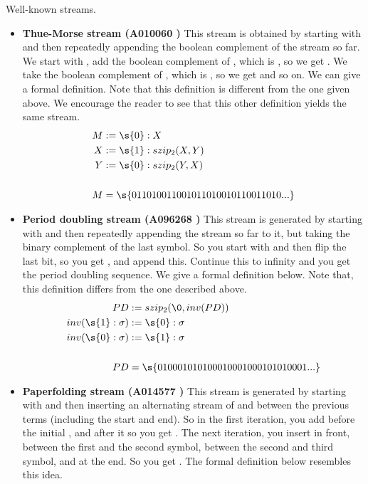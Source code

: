 \begin{example}{Well-known streams.}\label{well_known_streams}
	\begin{itemize}
		\item \textbf{Thue-Morse stream (A010060 \cite{oeis})}
		This stream is obtained by starting with  and then repeatedly appending the boolean complement of the stream so far. We start with , add the boolean complement of , which is , so we get . We take the boolean complement of , which is , so we get  and so on. We can give a formal definition. Note that this definition is different from the one given above. We encourage the reader to see that this other definition yields the same stream.
		\begin{align*}
			M &:= \s{0} : X \\
			X &:= \s{1} : szip_2(X,Y) \\
			Y &:= \s{0} : szip_2(Y,X) \\\\
			M &= \s{0 1 10 1001 10010110 10010110011010...}
		\end{align*}
		\item \textbf{Period doubling stream (A096268 \cite{oeis})} This stream is generated by starting with  and then repeatedly appending the stream so far to it, but taking the binary complement of the last symbol. So you start with  and then flip the last bit, so you get , and append this. Continue this to infinity and you get the period doubling sequence. We give a formal definition below. Note that, this definition differs from the one described above.
		\begin{align*}
			PD &:= szip_2(\0, inv(PD)) \\
			inv(\s{1} : \sigma) &:= \s{0} : \sigma \\
			inv(\s{0} : \sigma) &:= \s{1} : \sigma \\\\
			PD &= \s{01 00 0101 01000100 01000101010001...}
		\end{align*}
		\item \textbf{Paperfolding stream (A014577 \cite{oeis})} This stream is generated by starting with  and then inserting an alternating stream of  and  between the previous terms (including the start and end). So in the first iteration, you add  before the initial , and  after it so you get . The next iteration, you insert  in front,  between the first and the second symbol,  between the second and third symbol, and  at the end. So you get . The formal definition below resembles this idea.

\end{itemize}
\end{example}
